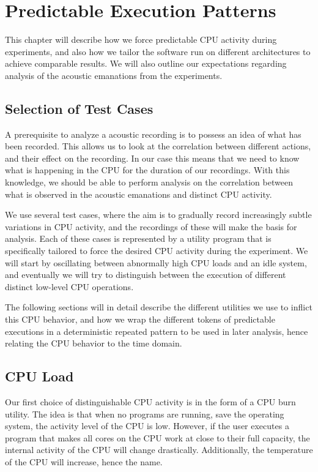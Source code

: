\chapter{Predictable Execution Patterns}\label{chp4:predictable_execution} 
This chapter will describe how we force predictable \gls{CPU} activity during experiments, and also how we tailor the software run on different architectures to achieve comparable results.
We will also outline our expectations regarding analysis of the acoustic emanations from the experiments.

\section{Selection of Test Cases}
A prerequisite to analyze a acoustic recording is to possess an idea of what has been recorded. 
This allows us to look at the correlation between different actions, and their effect on the recording.
In our case this means that we need to know what is happening in the \gls{CPU} for the duration of our recordings.
With this knowledge, we should be able to perform analysis on the correlation between what is observed in the acoustic emanations and distinct \gls{CPU} activity.

We use several test cases, where the aim is to gradually record increasingly subtle variations in \gls{CPU} activity, and the recordings of these will make the basis for analysis.
Each of these cases is represented by a utility program that is specifically tailored to force the desired \gls{CPU} activity during the experiment.
We will start by oscillating between abnormally high \gls{CPU} loads and an idle system, and eventually we will try to distinguish between the execution of different distinct low-level \gls{CPU} operations.

The following sections will in detail describe the different utilities we use to inflict this \gls{CPU} behavior, and how we wrap the different tokens of predictable executions in a deterministic repeated pattern to be used in later analysis, hence relating the \gls{CPU} behavior to the time domain.

\section{CPU Load}\label{chp4:sec:cpu_load}
Our first choice of distinguishable \gls{CPU} activity is in the form of a \gls{CPU} burn utility. 
The idea is that when no programs are running, save the operating system, the activity level of the \gls{CPU} is low. 
However, if the user executes a program that makes all cores on the \gls{CPU} work at close to their full capacity, the internal activity of the \gls{CPU} will change drastically.
Additionally, the temperature of the \gls{CPU} will increase, hence the name.

